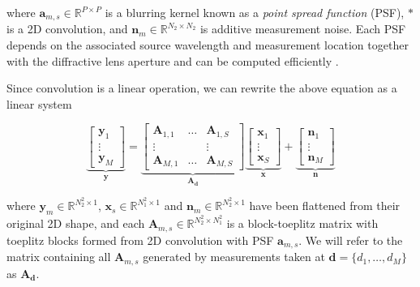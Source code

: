 \documentclass{article}
\begin{document}
where $\bm{a}_{m,s} \in \mathbb R^{P\times P}$ is a blurring kernel known as a
\emph{point spread function} (PSF), $\ast$ is a 2D convolution, and $\bm{n}_m
\in \mathbb R^{N_2 \times N_2}$ is additive measurement noise. Each PSF depends
on the associated source wavelength and measurement location together with the
diffractive lens aperture and can be computed efficiently
\cite{ayazgok2020efficient}.

Since convolution is a linear operation, we can rewrite the above equation as a
linear system

\begin{equation}
  \underbrace{
    \begin{bmatrix}\bm{y}_1 \\ \vdots \\ \bm{y}_M\end{bmatrix}
  }_{\bm{y}}
  =
  \underbrace{
    \begin{bmatrix}
      \bm{A}_{1, 1} & \hdots & \bm{A}_{1, S} \\
      \vdots & & \vdots \\
      \bm{A}_{M, 1} & \hdots & \bm{A}_{M, S}
    \end{bmatrix}
  }_{\bm{A}_{\bm{d}}}
  \underbrace{
    \begin{bmatrix}\bm{x}_1 \\ \vdots \\ \bm{x}_S\end{bmatrix}
  }_{\bm{x}}
  +
  \underbrace{
    \begin{bmatrix}\bm{n}_1 \\ \vdots \\ \bm{n}_M\end{bmatrix}
  }_{\bm{n}}
\label{eq:fourier_mtx}
\end{equation}


where $\bm{y}_m \in \mathbb R^{N_2^2\times 1}$, $\bm{x}_s \in \mathbb R^{N_1^2\times 1}$ and $\bm{n}_m \in \mathbb R^{N_2^2\times 1}$ have been flattened from their
original 2D shape, and each $\bm{A}_{m,s} \in \mathbb R^{N_2^2\times N_1^2}$ is a block-toeplitz
matrix with toeplitz blocks formed from 2D convolution with PSF $\bm{a}_{m,s}$.
We will refer to the matrix containing all $\bm{A}_{m,s}$
generated by measurements taken at $\bm{d} = \{d_1, \dots, d_M\}$ as
$\bm{A}_{\bm{d}}$.
\end{document}
